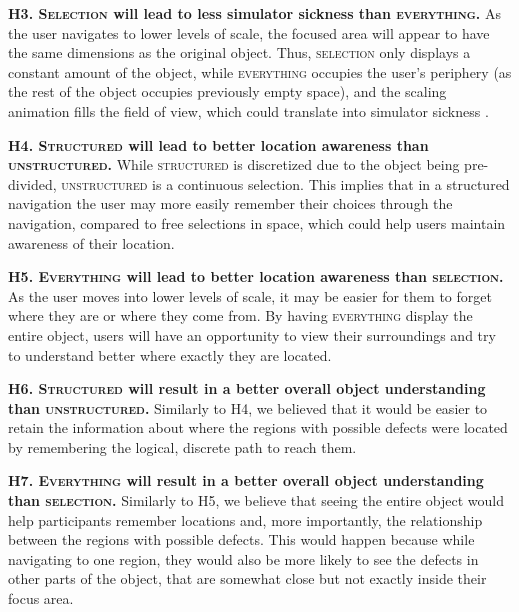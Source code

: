 \textbf{H3. \textsc{Selection} will lead to less simulator sickness than \textsc{everything}. }
As the user navigates to lower levels of scale, the focused area will appear to have the same dimensions as the original object. Thus, \textsc{selection} only displays a constant amount of the object, while \textsc{everything} occupies the user's periphery (as the rest of the object occupies previously empty space), and the scaling animation fills the field of view, which could translate into simulator sickness \cite{fernandes_combating_2016}.

\textbf{H4. \textsc{Structured} will lead to better location awareness than \textsc{unstructured}.}
While \textsc{structured} is discretized due to the object being pre-divided,  \textsc{unstructured} is a continuous selection. This implies that in a structured navigation the user may more easily remember their choices through the navigation, compared to free selections in space, which could help users maintain awareness of their location.

\textbf{H5. \textsc{Everything} will lead to better location awareness than \textsc{selection}.}
As the user moves into lower levels of scale, it may be easier for them to forget where they are or where they come from. By having \textsc{everything} display the entire object, users will have an opportunity to view their surroundings and try to understand better where exactly they are located.

\textbf{H6. \textsc{Structured} will result in a better overall object understanding than \textsc{unstructured}.}
Similarly to H4, we believed that it would be easier to retain the information about where the regions with possible defects were located by remembering the logical, discrete path to reach them.

\textbf{H7. \textsc{Everything} will result in a better overall object understanding than \textsc{selection}.}
Similarly to H5, we believe that seeing the entire object would help participants remember locations and, more importantly, the relationship between the regions with possible defects. This would happen because while navigating to one region, they would also be more likely to see the defects in other parts of the object, that are somewhat close but not exactly inside their focus area.

